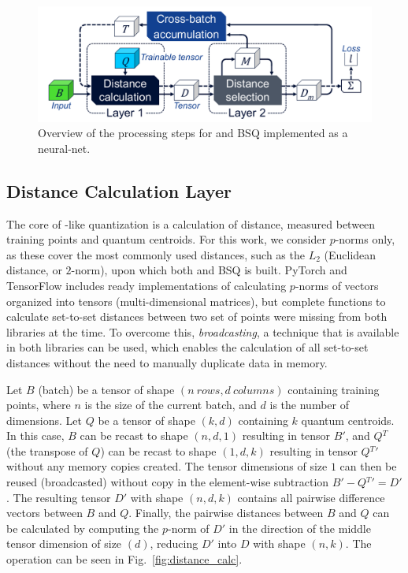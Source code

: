 			\begin{figure}[ht]
				\centering
				\includegraphics[width=0.75\linewidth]{figures/03_quantization/quant_overview/quant_overview.pdf}
				\caption[Neural-net-based \kmeans{} and BSQ processing steps]{Overview of the processing steps for \kmeans{} and \ac{BSQ} implemented as a neural-net.}
				\label{fig:quant_overview}
			\end{figure}
			
		\subsection{Distance Calculation Layer}
			
			The core of \kmeans{}-like quantization is a calculation of distance, measured between training points and quantum centroids.
			For this work, we consider $p$-norms only, as these cover the most commonly used distances, such as the $L_2$ (Euclidean distance, or $2$-norm), upon which both \kmeans{} and \ac{BSQ} is built.
			PyTorch and TensorFlow includes ready implementations of calculating $p$-norms of vectors organized into tensors (multi-dimensional matrices), but complete functions to calculate set-to-set distances between two set of points were missing from both libraries at the time.
			To overcome this, \textit{broadcasting}, a technique that is available in both libraries can be used, which enables the calculation of all set-to-set distances without the need to manually duplicate data in memory.
			
			Let $B$ (batch) be a tensor of shape $(n\: rows, d\: columns)$ containing training points, where $n$ is the size of the current batch, and $d$ is the number of dimensions.
			Let $Q$ be a tensor of shape $(k, d)$ containing $k$ quantum centroids.
			In this case, $B$ can be recast to shape $(n, d, 1)$ resulting in tensor $B'$, and $Q{^T}$ (the transpose of $Q$) can be recast to shape $(1, d, k)$ resulting in tensor $Q{^T}'$ without any memory copies created.
			The tensor dimensions of size $1$ can then be reused (broadcasted) without copy in the element-wise subtraction $B' - Q{^T}' = D'$.
			The resulting tensor $D'$ with shape $(n, d, k)$ contains all pairwise difference vectors between $B$ and $Q$.
			Finally, the pairwise distances between $B$ and $Q$ can be calculated by computing the $p$-norm of $D'$ in the direction of the middle tensor dimension of size $(d)$, reducing $D'$ into $D$ with shape $(n, k)$.
			The operation can be seen in Fig.~\ref{fig:distance_calc}.
			
